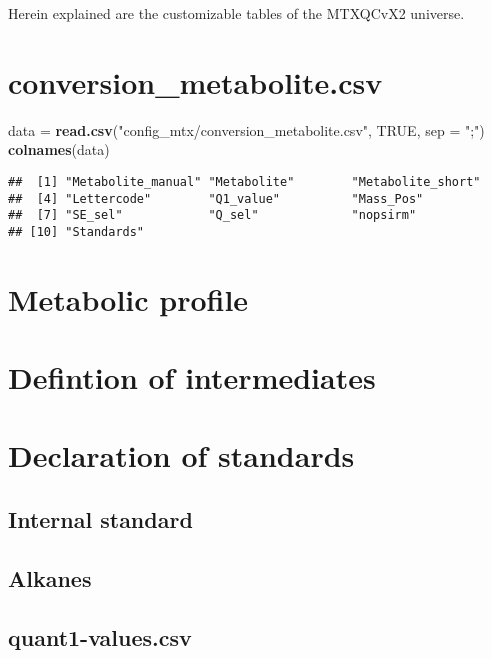 \documentclass[]{book}
\newenvironment{Shaded}{\begin{snugshade}}{\end{snugshade}}
\newcommand{\KeywordTok}[1]{\textcolor[rgb]{0.13,0.29,0.53}{\textbf{#1}}}
\newcommand{\DataTypeTok}[1]{\textcolor[rgb]{0.13,0.29,0.53}{#1}}
\newcommand{\StringTok}[1]{\textcolor[rgb]{0.31,0.60,0.02}{#1}}
\newcommand{\OtherTok}[1]{\textcolor[rgb]{0.56,0.35,0.01}{#1}}
\newcommand{\NormalTok}[1]{#1}
\theoremstyle{definition}
\theoremstyle{definition}
\theoremstyle{definition}
\theoremstyle{remark}
\begin{document}
Herein explained are the customizable tables of the MTXQCvX2 universe.

\section{conversion\_metabolite.csv}\label{conversion_metabolite.csv}

\begin{Shaded}
\begin{Highlighting}[]
\NormalTok{data =}\StringTok{ }\KeywordTok{read.csv}\NormalTok{(}\StringTok{"config_mtx/conversion_metabolite.csv"}\NormalTok{, }\OtherTok{TRUE}\NormalTok{, }\DataTypeTok{sep =} \StringTok{";"}\NormalTok{)}
\KeywordTok{colnames}\NormalTok{(data)}
\end{Highlighting}
\end{Shaded}

\begin{verbatim}
##  [1] "Metabolite_manual" "Metabolite"        "Metabolite_short" 
##  [4] "Lettercode"        "Q1_value"          "Mass_Pos"         
##  [7] "SE_sel"            "Q_sel"             "nopsirm"          
## [10] "Standards"
\end{verbatim}

\section{Metabolic profile}\label{metabolic-profile}

\section{Defintion of intermediates}\label{defintion-of-intermediates}

\section{Declaration of standards}\label{declaration-of-standards}

\subsection{Internal standard}\label{internal-standard-1}

\subsection{Alkanes}\label{alkanes}

\subsection{quant1-values.csv}\label{quant1-values.csv}
\end{document}
